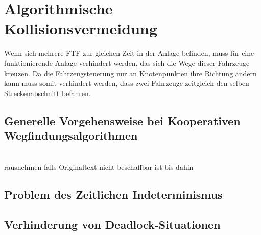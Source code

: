 \section{Algorithmische Kollisionsvermeidung}
	\label{Kollisionsvermeidung}
	Wenn sich mehrere \ac{FTF} zur gleichen Zeit in der Anlage befinden, muss für eine funktionierende Anlage verhindert werden, das sich die Wege dieser Fahrzeuge kreuzen. Da die Fahrzeugsteuerung nur an Knotenpunkten ihre Richtung ändern kann muss somit verhindert werden, dass zwei Fahrzeuge zeitgleich den selben Streckenabschnitt befahren. 
	
	\subsection{Generelle Vorgehensweise bei Kooperativen Wegfindungsalgorithmen}
	
		
		\cite{Silver2005}
		\\
		\cite{Zelinsky1992}rausnehmen falls Originaltext nicht beschaffbar ist bis dahin

	\subsection{Problem des Zeitlichen Indeterminismus}
	
	\cite{Erdmann1986}
	\subsection{Verhinderung von Deadlock-Situationen}

